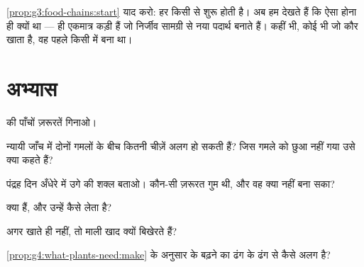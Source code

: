 \begin{remark}\label{rem:g4:what-plants-need:everyone}
\cref{prop:g3:food-chains:start} याद करो: हर  किसी  से
शुरू होती है। अब हम देखते हैं कि ऐसा होना ही क्यों था ---  ही एकमात्र
कड़ी हैं जो निर्जीव सामग्री से नया पदार्थ बनाते हैं। कहीं भी, कोई भी जो
कौर खाता है, वह पहले किसी  में बना था।
\end{remark}

\section{अभ्यास}

\begin{exercise}[$\star$]\label{exo:g4:what-plants-need:1}
 की पाँचों ज़रूरतें गिनाओ।
\end{exercise}

\begin{exercise}[$\star$]\label{exo:g4:what-plants-need:2}
न्यायी जाँच में दोनों गमलों के बीच कितनी चीज़ें अलग हो सकती हैं? जिस
गमले को छुआ नहीं गया उसे क्या कहते हैं?
\end{exercise}

\begin{exercise}[$\star$]\label{exo:g4:what-plants-need:3}
पंद्रह दिन अँधेरे में उगे  की शक्ल बताओ। कौन-सी ज़रूरत गुम थी, और
वह क्या नहीं बना सका?
\end{exercise}

\begin{exercise}[$\star$]\label{exo:g4:what-plants-need:4}
 क्या हैं, और  उन्हें कैसे लेता है?
\end{exercise}

\begin{exercise}[$\star$]\label{exo:g4:what-plants-need:5}
अगर  खाते ही नहीं, तो माली खाद क्यों बिखेरते हैं?
\end{exercise}

\begin{exercise}[$\star$]\label{exo:g4:what-plants-need:6}
\cref{prop:g4:what-plants-need:make} के अनुसार  के बढ़ने का ढंग
 के ढंग से कैसे अलग है?
\end{exercise}

